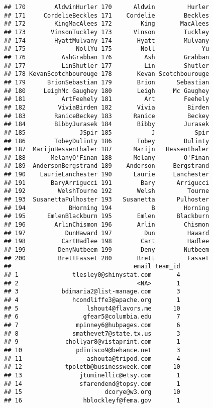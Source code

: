 \documentclass[]{article}
\begin{document}
\begin{verbatim}
## 170        AldwinHurler 170      Aldwin         Hurler
## 171     CordelieBeckles 171    Cordelie        Beckles
## 172        KingMacAlees 172        King       MacAlees
## 173       VinsonTuckley 173      Vinson        Tuckley
## 174        HyattMulvany 174       Hyatt        Mulvany
## 175              NollYu 175        Noll             Yu
## 176          AshGrabban 176         Ash        Grabban
## 177          LinShutler 177         Lin        Shutler
## 178 KevanScotchbourouge 178       Kevan Scotchbourouge
## 179      BrionSebastian 179       Brion      Sebastian
## 180     LeighMc Gaughey 180       Leigh     Mc Gaughey
## 181          ArtFeehely 181         Art        Feehely
## 182         ViviaBirden 182       Vivia         Birden
## 183        RaniceBeckey 183      Ranice         Beckey
## 184        BibbyJurasek 184       Bibby        Jurasek
## 185               JSpir 185           J           Spir
## 186        TobeyDulinty 186       Tobey        Dulinty
## 187  MarijnHessenthaler 187      Marijn   Hessenthaler
## 188       MelanyO'Finan 188      Melany        O'Finan
## 189  AndersonBergstrand 189    Anderson     Bergstrand
## 190    LaurieLanchester 190      Laurie     Lanchester
## 191       BaryArrigucci 191        Bary      Arrigucci
## 192         WelshTourne 192       Welsh         Tourne
## 193  SusanettaPulhoster 193   Susanetta      Pulhoster
## 194            BHorning 194           B        Horning
## 195      EmlenBlackburn 195       Emlen      Blackburn
## 196        ArlinChismon 196       Arlin        Chismon
## 197           DunHaward 197         Dun         Haward
## 198          CartHadlee 198        Cart         Hadlee
## 199         DenyNutbeem 199        Deny        Nutbeem
## 200         BrettFasset 200       Brett         Fasset
##                                  email team_id
## 1               tlesley0@shinystat.com       4
## 2                                 <NA>       1
## 3            bdimaria2@list-manage.com       3
## 4               hcondliffe3@apache.org       1
## 5                   lshout4@flavors.me      10
## 6                  gfear5@columbia.edu       7
## 7                mpinney6@hubpages.com       6
## 8               smathevet7@state.tx.us       3
## 9             chollyar8@vistaprint.com       1
## 10               pdinisco9@behance.net       3
## 11                  ashouta@tripod.com       4
## 12            tpoletb@businessweek.com      10
## 13                jtuminellic@etsy.com       1
## 14                sfarendend@topsy.com       1
## 15                       dcorye@w3.org      10
## 16                 hblockleyf@fema.gov       1

\end{verbatim}
\end{document}
